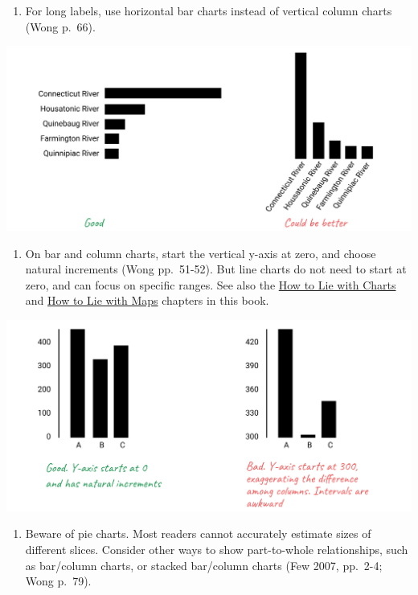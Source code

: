 \documentclass[
  english,
]{book}
\providecommand{\tightlist}{%
  \setlength{\itemsep}{0pt}\setlength{\parskip}{0pt}}
\begin{document}
\begin{enumerate}
\def\labelenumi{\arabic{enumi})}
\setcounter{enumi}{8}
\tightlist
\item
  For long labels, use horizontal bar charts instead of vertical column charts (Wong p.~66).
\end{enumerate}

\includegraphics{images/05-chart/Chart - 9 - Bar vs Column.png}

\begin{enumerate}
\def\labelenumi{\arabic{enumi})}
\setcounter{enumi}{9}
\tightlist
\item
  On bar and column charts, start the vertical y-axis at zero, and choose natural increments (Wong pp.~51-52). But line charts do not need to start at zero, and can focus on specific ranges. See also the \href{how-to-lie-with-charts}{How to Lie with Charts} and \href{how-to-lie-with-maps}{How to Lie with Maps} chapters in this book.
\end{enumerate}

\includegraphics{images/05-chart/Chart - 10 - Start with zero.png}

\begin{enumerate}
\def\labelenumi{\arabic{enumi})}
\setcounter{enumi}{10}
\tightlist
\item
  Beware of pie charts. Most readers cannot accurately estimate sizes of different slices. Consider other ways to show part-to-whole relationships, such as bar/column charts, or stacked bar/column charts (Few 2007, pp.~2-4; Wong p.~79).
\end{enumerate}
\end{document}

